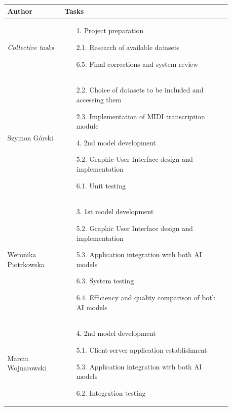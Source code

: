 \documentclass{article}
\begin{document}
\begin{center}
    \begin{tabular}{ |p{0.23\linewidth}|p{0.67\linewidth}| }
        \hline
        Author                                           & Tasks         \\
        \hline
        \multirow{3.75}{10em}{\textit{Collective tasks}} &
        \begin{itemize}
            \item [1.] Project preparation
            \item [2.1.] Research of available datasets
            \item [6.5.] Final corrections and system review
        \end{itemize}                  \\
        \hline
        \multirow{3.75}{10em}{Szymon Górski}             &
        \begin{itemize}
            \item [2.2.] Choice of datasets to be included and accessing them
            \item [2.3.] Implementation of MIDI transcription module
            \item [4.] 2nd model development
            \item [5.2.] Graphic User Interface design and implementation
            \item [6.1.] Unit testing
        \end{itemize} \\
        \hline
        \multirow{3.75}{10em}{Weronika Piotrkowska}      &
        \begin{itemize}
            \item [3.] 1st model development
            \item [5.2.] Graphic User Interface design and implementation
            \item [5.3.] Application integration with both AI models
            \item [6.3.] System testing
            \item [6.4.] Efficiency and quality comparison of both AI models
        \end{itemize}  \\
        \hline
        \multirow{3.75}{10em}{Marcin Wojnarowski}        &
        \begin{itemize}
            \item [4.] 2nd model development
            \item [5.1.] Client-server application establishment
            \item [5.3.] Application integration with both AI models
            \item [6.2.] Integration testing
        \end{itemize}          \\
        \hline
    \end{tabular}
\end{center}
\end{document}
